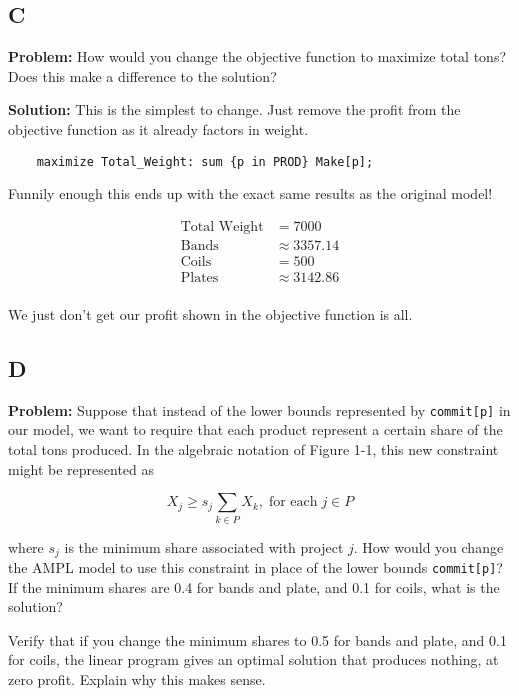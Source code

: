 \subsection*{C}

\textbf{Problem:} How would you change the objective function to maximize total tons? Does this make a difference to the solution?

\noindent\textbf{Solution:} This is the simplest to change. Just remove the profit from the objective function as it already factors in weight. 

\begin{lstlisting}
	maximize Total_Weight: sum {p in PROD} Make[p];
\end{lstlisting}

Funnily enough this ends up with the exact same results as the original model!

\begin{align*}
	\text{Total Weight} &= 7000 \\
	\text{Bands} &\approx 3357.14 \\
	\text{Coils} &= 500 \\
	\text{Plates} &\approx 3142.86 \\
\end{align*}

We just don't get our profit shown in the objective function is all. 

\subsection*{D}

\textbf{Problem:} Suppose that instead of the lower bounds represented by \texttt{commit[p]} in our model, we want to require that each product represent a certain share of the total tons produced. In the algebraic notation of Figure 1-1, this new constraint might be represented as

\[
	X_j \geq s_j \sum_{k \in P} X_k, \; \text{for each} \; j \in P
\]

where $s_j$ is the minimum share associated with project $j$. How would you change the AMPL model to use this constraint in place of the lower bounds \texttt{commit[p]}? If the minimum shares are 0.4 for bands and plate, and 0.1 for coils, what is the solution?

Verify that if you change the minimum shares to 0.5 for bands and plate, and 0.1 for coils, the linear program gives an optimal solution that produces nothing, at zero profit. Explain why this makes sense.

